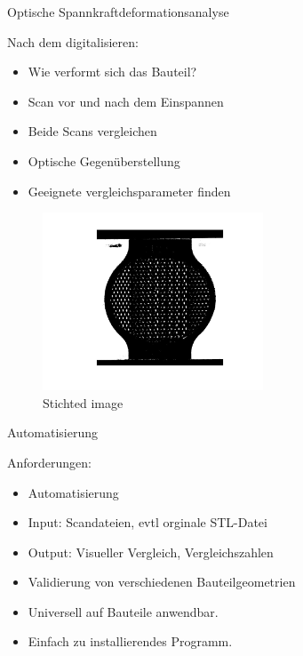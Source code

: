 \documentclass[../slides.tex]{subfiles}
\begin{document}
\begin{frame}{Optische Spannkraftdeformationsanalyse}
    \begin{minipage}[h]{.39\textwidth}
        \begin{block}{Nach dem digitalisieren:}
            \begin{itemize}
                \item Wie verformt sich das Bauteil?
                \item Scan vor und nach dem Einspannen
                \item Beide Scans vergleichen
                \item Optische Gegenüberstellung
                \item Geeignete vergleichsparameter finden
            \end{itemize}
        \end{block}
    \end{minipage}
    \hfill
    \begin{minipage}[h]{.6\textwidth}
      \begin{figure}[]
        \includegraphics[height=150pt]{img_niklas/stichted.png}
        \caption[short]{Stichted image}
      \end{figure}
    \end{minipage}
  \end{frame}

  \begin{frame}{Automatisierung}
    \begin{minipage}[h]{.6\textwidth}
        \begin{block}{Anforderungen:}
            \begin{itemize}
                \item Automatisierung
                \item Input: Scandateien, evtl orginale STL-Datei
                \item Output: Visueller Vergleich, Vergleichszahlen
                \item Validierung von verschiedenen Bauteilgeometrien 
                \item Universell auf Bauteile anwendbar.
                \item Einfach zu installierendes Programm.
            \end{itemize}
        \end{block}
    \end{minipage}
    \hfill
    \begin{minipage}[h]{.39\textwidth}
      
    \end{minipage}
  \end{frame}
\end{document}
